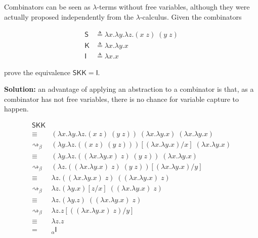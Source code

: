 \documentclass{article}
\begin{document}
\subsection{}\label{ex:4}

Combinators can be seen as $\lambda$-terms without free variables, 
although they were actually proposed independently from the 
$\lambda$-calculus. Given the combinators 

\begin{align*}
  \mathsf{S} &\triangleq \lambda x.\lambda y.\lambda z. 
    (x\;z)\;(y\;z) \\ 
  \mathsf{K} &\triangleq \lambda x.\lambda y.x \\ 
  \mathsf{I} &\triangleq \lambda x.x
\end{align*}

prove the equivalence $\mathsf{SKK} = \mathsf{I}$.

\textbf{Solution:} an advantage of applying an abstraction to 
a combinator is that, as a combinator has not free variables, 
there is no chance for variable capture to happen.

\begin{align*}
  \mathsf{SKK} & \\
    \equiv &(\lambda x.\lambda y.\lambda z. (x\;z)\;(y\;z))\;
      (\lambda x.\lambda y.x)\;
      (\lambda x.\lambda y.x) \\ 
    \rightsquigarrow_\beta 
      &(\lambda y.\lambda z. 
        ((x\;z)\;(y\;z))
      )[(\lambda x.\lambda y.x)/x]\;
      (\lambda x.\lambda y.x) \\ 
    \equiv 
      &(\lambda y.\lambda z. 
        ((\lambda x. \lambda y.x)\;z)\;(y\;z)
      )\;
      (\lambda x.\lambda y.x) \\ 
    \rightsquigarrow_\beta 
      &(\lambda z. 
        ((\lambda x. \lambda y.x)\;z)\;(y\;z)
      )[(\lambda x.\lambda y. x)/y] \\ 
    \equiv 
      &\lambda z. 
        ((\lambda x. \lambda y.x)\;z)\;
        ((\lambda x. \lambda y.x)\;z) \\ 
    \rightsquigarrow_\beta 
      &\lambda z. 
        (\lambda y.x)[z/x]\;
        ((\lambda x. \lambda y.x)\;z) \\ 
    \equiv 
      &\lambda z. 
        (\lambda y.z)\;
        ((\lambda x. \lambda y.x)\;z) \\ 
    \rightsquigarrow_\beta 
      &\lambda z. 
        z[((\lambda x. \lambda y.x)\;z)/y] \\
    \equiv &\lambda z.z \\ 
    =&_\alpha \mathsf{I}
\end{align*}
\end{document}
